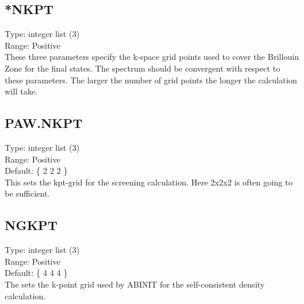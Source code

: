 \documentclass[12pt]{revtex4}
\begin{document}
\subsection{*NKPT}
Type: integer list (3) \\
Range: Positive \\

These three parameters specify the k-space grid points used to cover the Brillouin Zone for the final
states.  The spectrum should be convergent with respect to these parameters. The larger the number of 
grid points the longer the calculation will take. 

\subsection{PAW.NKPT}
Type: integer list (3) \\
Range: Positive \\
Default: \{ 2 2 2 \} \\

This sets the kpt-grid for the screening calculation. Here 2x2x2 is often going to be sufficient.




\subsection{NGKPT}
Type: integer list (3) \\
Range: Positive \\
Default: \{ 4 4 4 \} \\

The sets the k-point grid used by ABINIT for the self-consistent density calculation.
\end{document}
